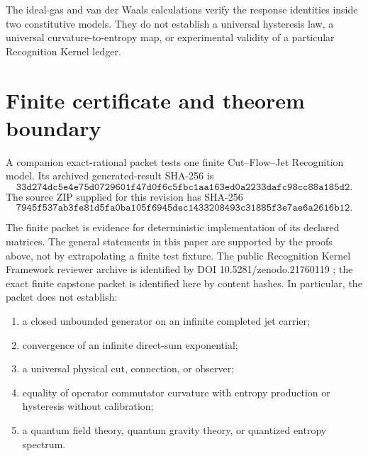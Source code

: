 \begin{remark}
The ideal-gas and van der Waals calculations verify the response identities inside two constitutive models.  They do not establish a universal hysteresis law, a universal curvature-to-entropy map, or experimental validity of a particular Recognition Kernel ledger.
\end{remark}

\section{Finite certificate and theorem boundary}

A companion exact-rational packet tests one finite Cut--Flow--Jet Recognition model.  Its archived generated-result SHA-256 is
\[
\texttt{33d274dc5e4e75d0729601f47d0f6c5fbc1aa163ed0a2233dafc98cc88a185d2}.
\]
The source ZIP supplied for this revision has SHA-256
\[
\texttt{7945f537ab3fe81d5fa0ba105f6945dec1433208493c31885f3e7ae6a2616b12}.
\]

The finite packet is evidence for deterministic implementation of its declared matrices.  The general statements in this paper are supported by the proofs above, not by extrapolating a finite test fixture.  The public Recognition Kernel Framework reviewer archive is identified by DOI 10.5281/zenodo.21760119 \cite{DabasRKF}; the exact finite capstone packet is identified here by content hashes.  In particular, the packet does not establish:
\begin{enumerate}[label=(\roman*)]
\item a closed unbounded generator on an infinite completed jet carrier;
\item convergence of an infinite direct-sum exponential;
\item a universal physical cut, connection, or observer;
\item equality of operator commutator curvature with entropy production or hysteresis without calibration;
\item a quantum field theory, quantum gravity theory, or quantized entropy spectrum.
\end{enumerate}
